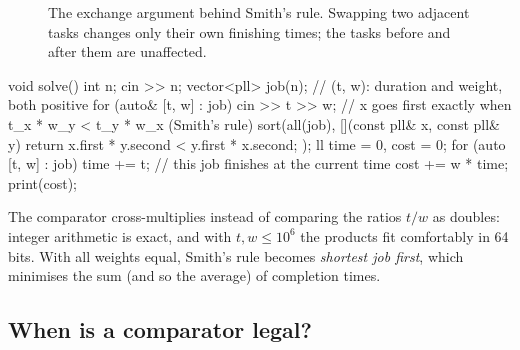 \begin{figure}[htbp]
\centering
{}
\caption{The exchange argument behind Smith's rule. Swapping two adjacent tasks changes only their own finishing times; the
tasks before and after them are unaffected.}
\label{fig:smith}
\end{figure}

\begin{code}
void solve() {
    int n;
    cin >> n;
    vector<pll> job(n);  // (t, w): duration and weight, both positive
    for (auto& [t, w] : job) cin >> t >> w;
    // x goes first exactly when t_x * w_y < t_y * w_x (Smith's rule)
    sort(all(job), [](const pll& x, const pll& y) {
        return x.first * y.second < y.first * x.second;
    });
    ll time = 0, cost = 0;
    for (auto [t, w] : job) {
        time += t;  // this job finishes at the current time
        cost += w * time;
    }
    print(cost);
}
\end{code}

The comparator cross-multiplies instead of comparing the ratios $t/w$ as doubles: integer arithmetic is exact, and with
$t, w \le 10^6$ the products fit comfortably in 64 bits. With all weights equal, Smith's rule becomes \emph{shortest job
first}, which minimises the sum (and so the average) of completion times.

\subsection{When is a comparator legal?}

